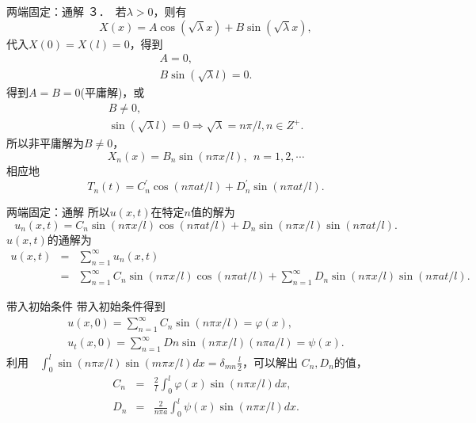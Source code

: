 \documentclass[11pt]{beamer}
\begin{document}
\begin{frame}{两端固定：通解}
３．　若$\lambda>0$，则有
\begin{equation}
X(x) = A \cos(\sqrt{\lambda}x) + B \sin(\sqrt{\lambda}x) ,
\end{equation}
代入$ X(0) = X(l) =0$，得到
\begin{eqnarray}
A = 0, \\
B \sin(\sqrt{\lambda}l)= 0.
\end{eqnarray} 
得到$A=B=0$(平庸解)，或
\begin{eqnarray}
B \neq 0, \\
\sin( \sqrt{\lambda} l) = 0 \Rightarrow \sqrt{\lambda} = n \pi / l, n \in Z^+.
\end{eqnarray}
所以非平庸解为$B\neq 0$，
\begin{equation}
X_n(x) = B_n \sin( n\pi x /l), ~~ n=1,2,\cdots
\end{equation}
相应地
\begin{equation}
T_n(t) = C^\prime_n \cos(n\pi a t/l) + D^\prime_n \sin(n\pi a t/l).
\end{equation}
\end{frame}

\begin{frame}{两端固定：通解}
所以$u(x,t)$在特定$n$值的解为
\begin{equation}
u_n(x,t) = C_n \sin(n\pi x /l) \cos(n\pi a t/l)
			+ D_n \sin(n\pi x/l) \sin(n\pi at/l).
\end{equation}
$u(x,t)$的通解为
\begin{eqnarray}
u(x,t) &=& \sum^\infty_{n=1}u_n(x,t) \\
		&=& \sum^\infty_{n=1} C_n \sin(n\pi x /l) \cos(n\pi a t/l) + \sum^\infty_{n=1} D_n \sin(n\pi x/l) \sin(n\pi at/l). \nonumber
\end{eqnarray}
\end{frame}

\begin{frame}{带入初始条件}
带入初始条件得到
\begin{eqnarray}
u(x,0) = \sum^\infty_{n=1} C_n \sin(n\pi x/l) = \varphi(x), \\
u_t(x,0) = \sum^\infty_{n=1} Dn \sin(n\pi x/l) (n\pi a/l) = \psi(x).
\end{eqnarray}
利用　$\int^l_{0} \sin(n\pi x/l) \sin(m\pi x/l) dx = \delta_{mn} \frac{l}{2}$，可以解出 $C_n, D_n$的值，
\begin{eqnarray}
C_n &=& \frac{2}{l} \int^l_0 \varphi(x) \sin(n\pi x/l) dx, \\
D_n &=& \frac{2}{n\pi a} \int^l_0 \psi(x) \sin(n\pi x/l) dx.
\end{eqnarray}
\end{frame}
\end{document}
